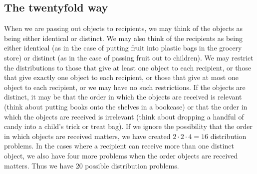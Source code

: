 \documentclass[10pt,]{book}
\theoremstyle{plain}
\theoremstyle{definition}
\theoremstyle{definition}
\numberwithin{equation}{chapter}
\begin{document}
\subsection[{The twentyfold way}]{The twentyfold way}\label{subsection-28}
When we are passing out objects to recipients, we may think of the objects as being either identical or distinct. We may also think of the recipients as being either identical (as in the case of putting fruit into plastic bags in the grocery store) or distinct (as in the case of passing fruit out to children). We may restrict the distributions to those that give at least one object to each recipient, or those that give exactly one object to each recipient, or those that give at most one object to each recipient, or we may have no such restrictions. If the objects are distinct, it may be that the order in which the objects are received is relevant (think about putting books onto the shelves in a bookcase) or that the order in which the objects are received is irrelevant (think about dropping a handful of candy into a child's trick or treat bag). If we ignore the possibility that the order in which objects are received matters, we have created \(2\cdot2\cdot4=16\) distribution problems. In the cases where a recipient can receive more than one distinct object, we also have four more problems when the order objects are received matters. Thus we have 20 possible distribution problems.%
\end{document}
